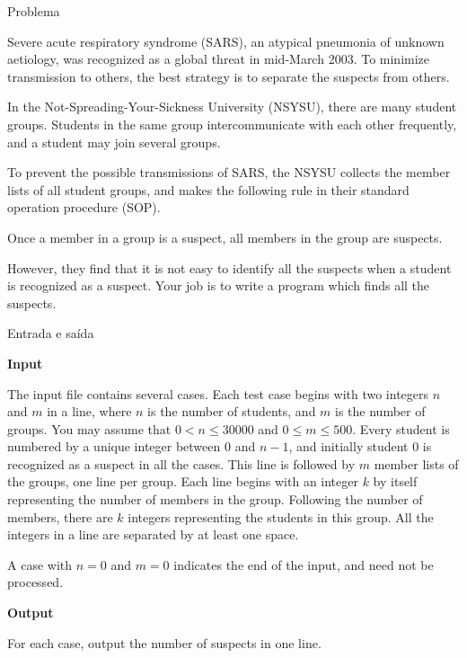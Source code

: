 
\begin{frame}[fragile]{Problema}

Severe acute respiratory syndrome (SARS), an atypical pneumonia of unknown aetiology, was recognized as a global threat in mid-March 2003. To minimize transmission to others, the best strategy is
to separate the suspects from others.

In the Not-Spreading-Your-Sickness University (NSYSU), there are many student groups. Students
in the same group intercommunicate with each other frequently, and a student may join several groups.

To prevent the possible transmissions of SARS, the NSYSU collects the member lists of all student
groups, and makes the following rule in their standard operation procedure (SOP).

\begin{center}
Once a member in a group is a suspect, all members in the group are suspects.
\end{center}

However, they find that it is not easy to identify all the suspects when a student is recognized as a
suspect. Your job is to write a program which finds all the suspects.

\end{frame}

\begin{frame}[fragile]{Entrada e saída}

\textbf{Input}

The input file contains several cases. Each test case begins with two integers $n$ and $m$ in a 
line, where $n$ is the number of students, and $m$ is the number of groups. You may assume that 
$0 < n \leq 30000$ and $0 \leq m \leq 500$. Every student is numbered by a unique integer between 
$0$ and $n - 1$, and initially student $0$ is recognized as a suspect in all the cases. This line 
is followed by $m$ member lists of the groups, one line per group. Each line begins with an 
integer $k$ by itself representing the number of members in the group. Following the number of 
members, there are $k$ integers representing the students in this group.  All the integers in a 
line are separated by at least one space.

A case with $n = 0$ and $m = 0$ indicates the end of the input, and need not be processed.

\textbf{Output}

For each case, output the number of suspects in one line.

\end{frame}


